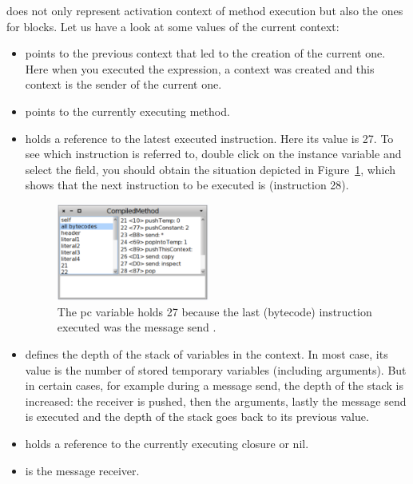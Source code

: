 \documentclass[a4paper,10pt,twoside]{book}
\begin{document}
 does not only represent activation context of method execution but also
the ones for blocks. Let us have a look at some values of the current context:

\begin{itemize}
\item {} points to the previous context that led to the creation of the current one. Here when you executed the expression, a context was created and this context is the sender of the current one.

\item {} points to the currently executing method.

\item {} holds a reference to the latest executed instruction. Here its value is 27. To see which instruction is referred to, double click on the  instance variable and select the  field, you should obtain the situation depicted in Figure~\ref{ByteCodes}, which shows that the next instruction to be executed is  (instruction 28).

\begin{figure}[b]
  \begin{center}\includegraphics[width=5cm]{ByteCodes}
    \caption{The pc variable holds 27 because the last (bytecode) instruction executed was the message send .\label{ByteCodes}}
  \end{center}
\end{figure}

\item {} defines the depth of the stack of variables in the context. In most case, its value is the number of stored temporary variables (including arguments). But in certain cases, for example during a message send, the depth of the stack is increased: the receiver is pushed, then the arguments, lastly the message send is executed and the depth of the stack goes back to its previous value.

\item {} holds a reference to the currently executing closure or nil.

\item {} is the message receiver.
\end{itemize}
\end{document}
